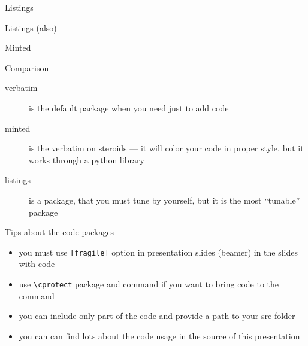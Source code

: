 \begin{frame}[fragile]{Listings\magicPage}\relax

\cprotect{}
\end{frame}

\begin{frame}[fragile]{Listings (also)\magicPage}\relax

\cprotect{}

 
\end{frame}

\begin{frame}[fragile]{Minted\magicPage}\relax

\cprotect{}
\end{frame}

\begin{frame}[fragile]{Comparison\magicPage}\relax
    \begin{description}
         \item[verbatim] is the default package when you need just to add code 
         \item[minted] is the verbatim on steroids --- it will color your code in proper style, but it works through a python library
         \item[listings] is a package, that you must tune by yourself, but it is the most ``tunable'' package
    \end{description}
    
\end{frame}

\begin{frame}[fragile]{Tips about the code packages\magicPage}\relax
    \begin{itemize}
         \item you must use {\csk \verb|[fragile]|} option in presentation slides (beamer) in the slides with code 
         \item use {\csk \verb|\cprotect|} package and command if you want to bring code to the command
         \item you can include only part of the code and provide a path to your src folder
         \item you can can find lots about the code usage in the source of this presentation  
    \end{itemize}
\end{frame}

